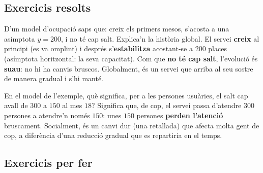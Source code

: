 \subsection{Exercicis resolts}

\begin{exresolt}
D'un model d'ocupació saps que: creix els primers mesos, s'acosta a una asímptota
$y=200$, i no té cap salt. Explica'n la història global.
\solucio
El servei \textbf{creix} al principi (es va omplint) i després s'\textbf{estabilitza}
acostant-se a $200$ places (asímptota horitzontal: la seva capacitat). Com que
\textbf{no té cap salt}, l'evolució és \textbf{suau}: no hi ha canvis bruscos.
Globalment, és un servei que arriba al seu sostre de manera gradual i s'hi manté.
\end{exresolt}

\begin{exresolt}
En el model de l'exemple, què significa, per a les persones usuàries, el salt cap avall
de $300$ a $150$ al mes $18$?
\solucio
Significa que, de cop, el servei passa d'atendre $300$ persones a atendre'n només
$150$: unes $150$ persones \textbf{perden l'atenció} bruscament. Socialment, és un
canvi dur (una retallada) que afecta molta gent de cop, a diferència d'una reducció
gradual que es repartiria en el temps.
\end{exresolt}

\subsection{Exercicis per fer}

